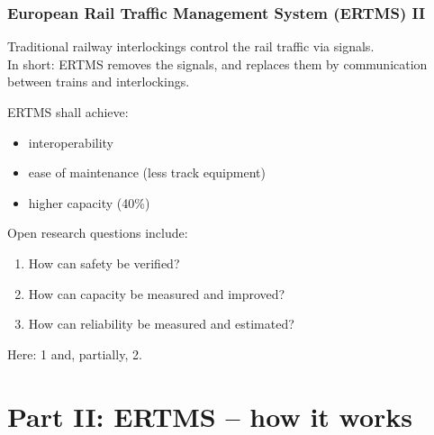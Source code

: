 \documentclass{beamer}
\begin{document}
\begin{frame}

\frametitle{European Rail Traffic Management System (ERTMS) II}

Traditional railway interlockings control the rail traffic via signals. \\
In short:  ERTMS  removes the signals, and replaces them by communication between trains and interlockings.

\bigskip\bigskip

ERTMS  shall achieve:
\begin{itemize}

\item interoperability

\item ease of maintenance  (less track equipment) 

\item higher capacity \pause (40\%)\pause 

\end{itemize}

\bigskip\bigskip

Open research questions include:
\begin{enumerate}

\item
How can safety be verified? 

\item
How can capacity be measured and improved?

\item
How can reliability be measured and estimated?\pause

\end{enumerate}

Here: 1 and, partially, 2.

\end{frame} 

\section{Part II: ERTMS -- how it works}

\end{document}
